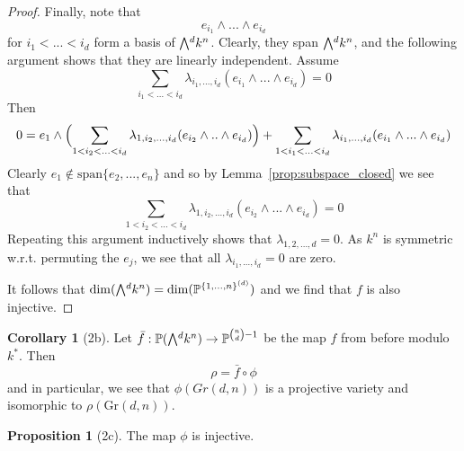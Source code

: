 \documentclass{scrartcl}
\newcommand{\Proj}{\mathbb{P}}
\newcommand{\Gr}{\mathrm{Gr}}
\newcommand{\extpow}{\mathchoice{{\textstyle\bigwedge}}
    {{\bigwedge}}
    {{\textstyle\wedge}}
    {{\scriptstyle\wedge}}}
\newcommand{\vspan}{\mathrm{span}}
\theoremstyle{definition}
\newtheorem{proposition}[definition]{Proposition}
\newtheorem{corollary}[definition]{Corollary}
\begin{document}
\begin{proof}
    Finally, note that
    \begin{equation*}
        e_{i_1} \wedge ... \wedge e_{i_d}
    \end{equation*}
    for $i_1 < ... < i_d$ form a basis of $\extpow^d k^n$.
    Clearly, they span $\extpow^d k^n$, and the following argument shows that they are linearly independent.
    Assume
    \begin{equation*}
        \sum_{i_1 < ... < i_d} \lambda_{i_1, ..., i_d} (e_{i_1} \wedge ... \wedge e_{i_d}) = 0
    \end{equation*}
    Then
    \begin{equation*}
        0 = e_1 \wedge \Bigl( \sum_{1 < i_2 < ... < i_d} \lambda_{1, i_2, ..., i_d} (e_{i_2} \wedge .. \wedge e_{i_d}) \Bigr) + \sum_{1 < i_1 < ... < i_d} \lambda_{i_1, ..., i_d} (e_{i_1} \wedge ... \wedge e_{i_d} )
    \end{equation*}
    Clearly $e_1 \notin \vspan\{e_2, ..., e_n\}$ and so by Lemma~\ref{prop:subspace_closed} we see that
    \begin{equation*}
        \sum_{1 < i_2 < ... < i_d} \lambda_{1, i_2, ..., i_d} (e_{i_2} \wedge ... \wedge e_{i_d}) = 0
    \end{equation*}
    Repeating this argument inductively shows that $\lambda_{1, 2, ..., d} = 0$.
    As $k^n$ is symmetric w.r.t. permuting the $e_j$, we see that all $\lambda_{i_1, ..., i_d} = 0$ are zero.

    It follows that $\dim(\extpow^d k^n) = \dim(\Proj^{\{1, ..., n\}^{(d)}})$ and we find that $f$ is also injective.
\end{proof}
\begin{corollary}[2b]
    \label{prop:image_phi}
    Let $\bar{f}: \Proj(\extpow^d k^n) \to \Proj^{{n \choose d} - 1}$ be the map $f$ from before modulo $k^*$.
    Then
    \begin{equation*}
        \rho = \bar{f} \circ \phi
    \end{equation*}
    and in particular, we see that $\phi(Gr(d, n))$ is a projective variety and isomorphic to $\rho(\Gr(d, n))$.
\end{corollary}
\begin{proposition}[2c]
    The map $\phi$ is injective.
\end{proposition}
\end{document}
